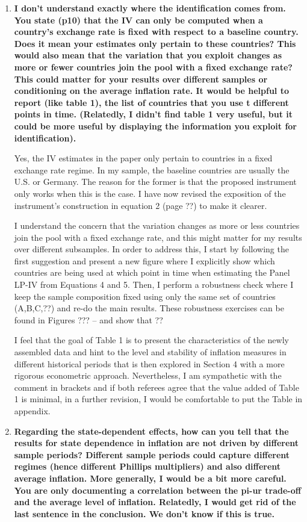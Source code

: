 \documentclass[12pt]{article}
\begin{document}
\begin{enumerate}
\item \textbf{I don't understand exactly where the identification comes from. You state (p10) that the IV can only be computed when a country's exchange rate is fixed with respect to a baseline country. Does it mean your estimates only pertain to these countries? This would also mean that the variation that you exploit changes as more or fewer countries join the pool with a fixed exchange rate? This could matter for your results over different samples or conditioning on the average inflation rate. It would be helpful to report (like table 1), the list of countries that you use t different points in time. (Relatedly, I didn't find table 1 very useful, but it could be more useful by displaying the information you exploit for identification).}

Yes, the IV estimates in the paper only pertain to countries in a fixed exchange rate regime. In my sample, the baseline countries are usually the U.S. or Germany. The reason for the former is that the proposed instrument only works when this is the case. I have now revised the exposition of the instrument’s construction in equation 2 (page ??) to make it clearer.

I understand the concern that the variation changes as more or less countries join the pool with a fixed exchange rate, and this might matter for my results over different subsamples. In order to address this, I start by following the first suggestion and present a new figure where I explicitly show which countries are being used at which point in time when estimating the Panel LP-IV from Equations 4 and 5. Then, I perform a robustness check where I keep the sample composition fixed using only the same set of countries (A,B,C,??) and re-do the main results. These robustness exercises can be found in Figures ??? – and show that ??

I feel that the goal of Table 1 is to present the characteristics of the newly assembled data and hint to the level and stability of inflation measures in different historical periods that is then explored in Section 4 with a more rigorous econometric approach. Nevertheless, I am sympathetic with the comment in brackets and if both referees agree that the value added of Table 1 is minimal, in a further revision, I would be comfortable to put the Table in appendix.


\item \textbf{Regarding the state-dependent effects, how can you tell that the results for state dependence in inflation are not driven by different sample periods? Different sample periods could capture different regimes (hence different Phillips multipliers) and also different average inflation. More generally, I would be a bit more careful. You are only documenting a correlation between the pi-ur trade-off and the average level of inflation. Relatedly, I would get rid of the last sentence in the conclusion. We don't know if this is true.} 


\end{enumerate}
\end{document}
